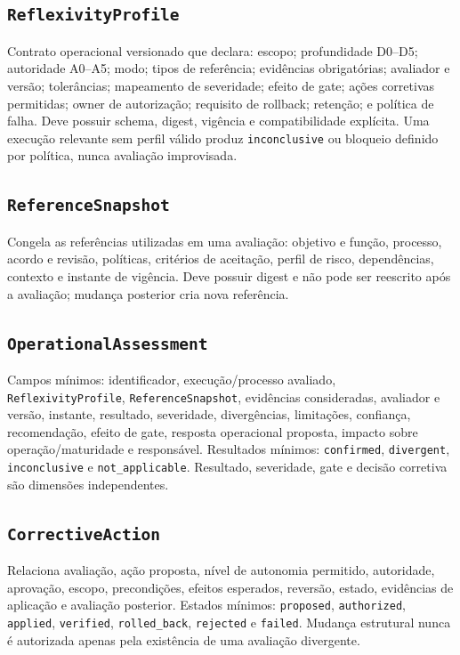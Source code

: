 \documentclass[11pt,a4paper,oneside]{article}
\begin{document}
\subsection{\texttt{ReflexivityProfile}}
Contrato operacional versionado que declara: escopo; profundidade D0--D5; autoridade A0--A5; modo; tipos de referência; evidências obrigatórias; avaliador e versão; tolerâncias; mapeamento de severidade; efeito de gate; ações corretivas permitidas; owner de autorização; requisito de rollback; retenção; e política de falha. Deve possuir schema, digest, vigência e compatibilidade explícita. Uma execução relevante sem perfil válido produz \texttt{inconclusive} ou bloqueio definido por política, nunca avaliação improvisada.

\subsection{\texttt{ReferenceSnapshot}}
Congela as referências utilizadas em uma avaliação: objetivo e função, processo, acordo e revisão, políticas, critérios de aceitação, perfil de risco, dependências, contexto e instante de vigência. Deve possuir digest e não pode ser reescrito após a avaliação; mudança posterior cria nova referência.

\subsection{\texttt{OperationalAssessment}}
Campos mínimos: identificador, execução/processo avaliado, \texttt{ReflexivityProfile}, \texttt{ReferenceSnapshot}, evidências consideradas, avaliador e versão, instante, resultado, severidade, divergências, limitações, confiança, recomendação, efeito de gate, resposta operacional proposta, impacto sobre operação/maturidade e responsável. Resultados mínimos: \texttt{confirmed}, \texttt{divergent}, \texttt{inconclusive} e \texttt{not\_applicable}. Resultado, severidade, gate e decisão corretiva são dimensões independentes.

\subsection{\texttt{CorrectiveAction}}
Relaciona avaliação, ação proposta, nível de autonomia permitido, autoridade, aprovação, escopo, precondições, efeitos esperados, reversão, estado, evidências de aplicação e avaliação posterior. Estados mínimos: \texttt{proposed}, \texttt{authorized}, \texttt{applied}, \texttt{verified}, \texttt{rolled\_back}, \texttt{rejected} e \texttt{failed}. Mudança estrutural nunca é autorizada apenas pela existência de uma avaliação divergente.
\end{document}

